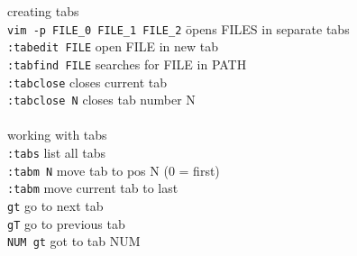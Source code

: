 \documentclass[a4paper,10pt]{scrartcl}
\begin{document}
\begin{tabbing}
\large{creating tabs}\\
\texttt{vim -p FILE\_0 FILE\_1 FILE\_2}	\hspace{0.5 cm}\= opens FILES in separate tabs\\
\texttt{:tabedit FILE}					\> open FILE in new tab\\
\texttt{:tabfind FILE}					\> searches for FILE in PATH\\
\texttt{:tabclose}						\> closes current tab\\
\texttt{:tabclose N}					\> closes tab number  N\\\\

\large{working with tabs}\\
\texttt{:tabs}			\> list all tabs\\
\texttt{:tabm N}		\> move tab to pos N (0 = first)\\
\texttt{:tabm}			\> move current tab to last\\
\texttt{gt}				\> go to next tab\\
\texttt{gT}				\> go to previous tab\\
\texttt{NUM gt}			\> got to tab NUM\\
\end{tabbing}
\end{document}
